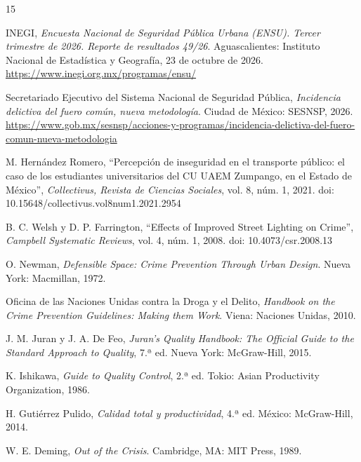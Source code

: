 \documentclass[11pt,a4paper]{article}
\begin{document}

\begin{thebibliography}{15}
\footnotesize
\setlength{\itemsep}{2pt}
\setlength{\parskip}{0pt}

INEGI, \textit{Encuesta Nacional de Seguridad Pública Urbana (ENSU). Tercer
trimestre de 2026. Reporte de resultados 49/26}. Aguascalientes: Instituto
Nacional de Estadística y Geografía, 23 de octubre de 2026.
\url{https://www.inegi.org.mx/programas/ensu/}

Secretariado Ejecutivo del Sistema Nacional de Seguridad Pública,
\textit{Incidencia delictiva del fuero común, nueva metodología}. Ciudad de
México: SESNSP, 2026.
\url{https://www.gob.mx/sesnsp/acciones-y-programas/incidencia-delictiva-del-fuero-comun-nueva-metodologia}

M. Hernández Romero, ``Percepción de inseguridad en el transporte público: el
caso de los estudiantes universitarios del CU UAEM Zumpango, en el Estado de
México'', \textit{Collectivus, Revista de Ciencias Sociales}, vol. 8, núm. 1,
2021. doi: 10.15648/collectivus.vol8num1.2021.2954

B. C. Welsh y D. P. Farrington, ``Effects of Improved Street Lighting on
Crime'', \textit{Campbell Systematic Reviews}, vol. 4, núm. 1, 2008.
doi: 10.4073/csr.2008.13

O. Newman, \textit{Defensible Space: Crime Prevention Through Urban Design}.
Nueva York: Macmillan, 1972.

Oficina de las Naciones Unidas contra la Droga y el Delito, \textit{Handbook on
the Crime Prevention Guidelines: Making them Work}. Viena: Naciones Unidas,
2010.

J. M. Juran y J. A. De Feo, \textit{Juran's Quality Handbook: The Official Guide
to the Standard Approach to Quality}, 7.ª ed. Nueva York: McGraw-Hill, 2015.

K. Ishikawa, \textit{Guide to Quality Control}, 2.ª ed. Tokio: Asian
Productivity Organization, 1986.

H. Gutiérrez Pulido, \textit{Calidad total y productividad}, 4.ª ed. México:
McGraw-Hill, 2014.

W. E. Deming, \textit{Out of the Crisis}. Cambridge, MA: MIT Press, 1989.


\end{thebibliography}
\end{document}

